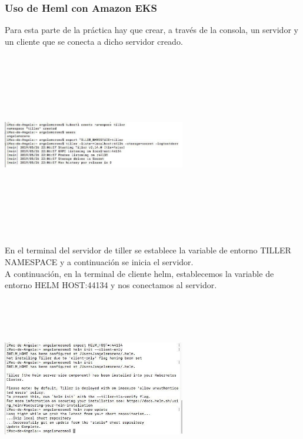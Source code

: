 \documentclass[english,runningheads,a4paper]{llncs}[2018/03/10]
\newenvironment{nscenter}
 {\parskip=0pt\par\nopagebreak\centering}
 {\par\noindent\ignorespacesafterend}
\begin{document}
\subsubsection*{Uso de Heml con Amazon EKS}
Para esta parte de la práctica hay que crear, a través de la consola, un 
servidor y un cliente que se conecta a dicho servidor creado.
\newline
\begin{nscenter}
\includegraphics[width=8cm,height=8cm,keepaspectratio]{./Contenedores/AWS/24.jpg}
\end{nscenter}
\newline
En el terminal del servidor de tiller se establece la variable de entorno 
TILLER NAMESPACE y a continuación se inicia el servidor. \\
A continuación, en la terminal de cliente helm, establecemos la variable de 
entorno HELM HOST:44134 y nos conectamos al servidor.
\newline
\begin{nscenter}
\includegraphics[width=8cm,height=8cm,keepaspectratio]{./Contenedores/AWS/25.jpg}
\end{nscenter}
\newpage
\end{document}
